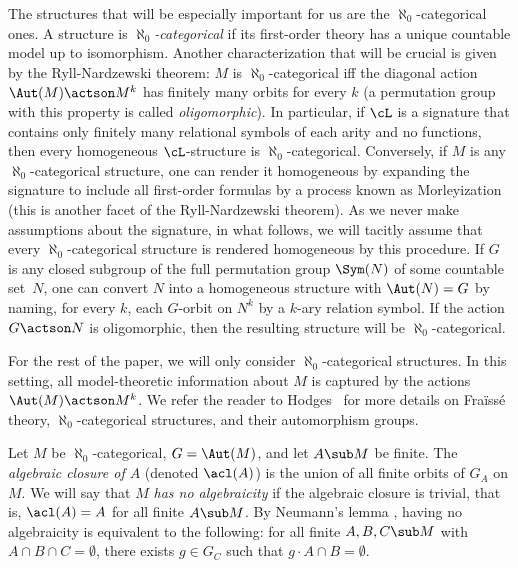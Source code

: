 The structures that will be especially important for us are the $\aleph_0$-categorical ones. A structure is \emph{$\aleph_0$-categorical} if its first-order theory has a unique countable model up to isomorphism. Another characterization that will be crucial is given by the Ryll-Nardzewski theorem: $M$ is $\aleph_0$-categorical iff the diagonal action $\Aut(M) \actson M^k$ has finitely many orbits for every $k$ (a permutation group with this property is called \emph{oligomorphic}). In particular, if $\cL$ is a signature that contains only finitely many relational symbols of each arity and no functions, then every homogeneous $\cL$-structure is $\aleph_0$-categorical. Conversely, if $M$ is any $\aleph_0$-categorical structure, one can render it homogeneous by expanding the signature to include all first-order formulas by a process known as Morleyization (this is another facet of the Ryll-Nardzewski theorem). As we never make assumptions about the signature, in what follows, we will tacitly assume that every $\aleph_0$-categorical structure is rendered homogeneous by this procedure. If $G$ is any closed subgroup of the full permutation group $\Sym(N)$ of some countable set~$N$, one can convert $N$ into a homogeneous structure with $\Aut(N) = G$ by naming, for every $k$, each $G$-orbit on $N^k$ by a $k$-ary relation symbol. If the action $G \actson N$ is oligomorphic, then the resulting structure will be $\aleph_0$-categorical.

For the rest of the paper, we will only consider $\aleph_0$-categorical structures. In this setting, all model-theoretic information about $M$ is captured by the actions $\Aut(M) \actson\nobreak M^k$. We refer the reader to Hodges~\cite{Hodges1993} for more details on Fraïssé theory, $\aleph_0$-categorical structures, and their automorphism groups.

Let $M$ be $\aleph_0$-categorical, $G = \Aut(M)$, and let $A \sub M$ be finite. The \emph{algebraic closure of $A$} (denoted $\acl(A)$) is the union of all finite orbits of $G_A$ on $M$. We will say that $M$ \emph{has no algebraicity} if the algebraic closure is trivial, that is, $\acl(A) = A$ for all finite $A \sub M$. By Neumann's lemma \cite[Lem.\,4.2.1]{Hodges1993}, having no algebraicity is equivalent to the following: for all finite $A, B, C \sub M$ with $A \cap B \cap C = \emptyset$, there exists $g \in G_C$ such that $g \cdot A \cap B = \emptyset$.

